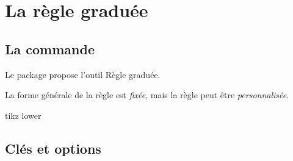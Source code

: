 \documentclass[french,a4paper,11pt]{article}
\begin{document}
\pagebreak

\section{La règle graduée}

\subsection{La commande}

\begin{cautionblock}
Le package propose l'outil \textsf{Règle graduée}.

La forme générale de la règle est \textit{fixée}, mais la règle peut être \textit{personnalisée}.
\end{cautionblock}

\begin{PresentationCode}{tikz lower}
\tkzRegle
\end{PresentationCode}

\subsection{Clés et options}
\end{document}
